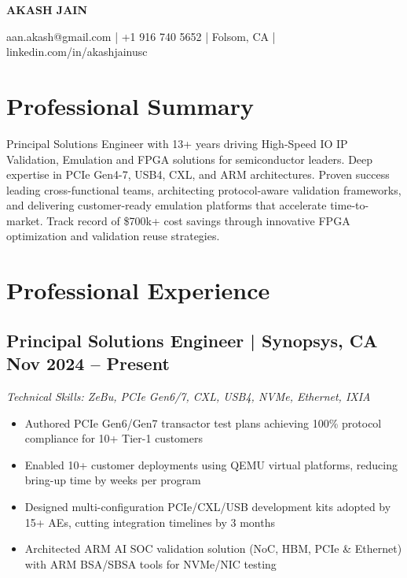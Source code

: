 \documentclass[10pt,letterpaper]{article}
\newcommand{\resumeheader}[1]{%
  \begin{center}
    \textbf{\Large #1}
  \end{center}
  \vspace{-15pt}
}
\newcommand{\contactline}[1]{%
  \begin{center}
    \small #1
  \end{center}
  \vspace{-10pt}
}
\newcommand{\jobheader}[4]{%
  \subsection*{\textbf{#1} | #2  \hfill #4}
  \vspace{-1pt}
  {\small\textit{Technical Skills: #3}}
  \vspace{0pt}
}
\begin{document}

\resumeheader{AKASH JAIN}

\contactline{
  aan.akash@gmail.com | +1 916 740 5652 | Folsom, CA | linkedin.com/in/akashjainusc
}


\section{Professional Summary}

{\small
Principal Solutions Engineer with 13+ years driving High-Speed IO IP Validation, Emulation and FPGA solutions for semiconductor leaders. Deep expertise in PCIe Gen4-7, USB4, CXL, and ARM architectures. Proven success leading cross-functional teams, architecting protocol-aware validation frameworks, and delivering customer-ready emulation platforms that accelerate time-to-market. Track record of \$700k+ cost savings through innovative FPGA optimization and validation reuse strategies.
}


\section{Professional Experience}

\jobheader{Principal Solutions Engineer}{Synopsys, CA}{ZeBu, PCIe Gen6/7, CXL, USB4, NVMe, Ethernet, IXIA}{Nov 2024 -- Present}

\begin{itemize}
\item Authored PCIe Gen6/Gen7 transactor test plans achieving 100\% protocol compliance for 10+ Tier-1 customers
\item Enabled 10+ customer deployments using QEMU virtual platforms, reducing bring-up time by weeks per program
\item Designed multi-configuration PCIe/CXL/USB development kits adopted by 15+ AEs, cutting integration timelines by 3 months
\item Architected ARM AI SOC validation solution (NoC, HBM, PCIe \& Ethernet) with ARM BSA/SBSA tools for NVMe/NIC testing
\end{itemize}
\end{document}
